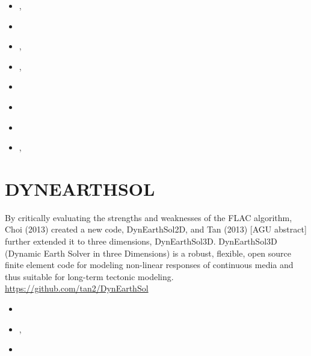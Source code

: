 \begin{small}
\begin{itemize}
\item[\twothousandeight]     \textcite{brtf08}, \textcite{thfb08}
\item[\twothousandnine]      \textcite{yahb09}
\item[\twothousandten]       \textcite{brya10}, \textcite{lobh10}
\item[\twothousandfourteen]  \textcite{mutg14}, \textcite{whbb14}
\item[\twothousandeighteen]  \textcite{neew18}
\item[\twothousandnineteen]  \textcite{koen19}
\item[\twothousandtwenty]    \textcite{scwh20}
\item[\twothousandtwentytwo] \textcite{kone22}, \textcite{konf22}
\end{itemize}
\end{small} 

\section{DYNEARTHSOL} 

By critically evaluating the strengths and weaknesses of the
FLAC algorithm, Choi \etal (2013) created a new code, DynEarthSol2D, 
and Tan \etal (2013) [AGU abstract] further extended it to three
dimensions, DynEarthSol3D. DynEarthSol3D (Dynamic Earth Solver
in three Dimensions) is a robust, flexible, open source finite
element code for modeling non-linear responses of continuous
media and thus suitable for long-term tectonic modeling.
\url{https://github.com/tan2/DynEarthSol}

\begin{small} 
\begin{itemize}
\item[\twothousandthirteen]  \textcite{chtl13}
\item[\twothousandfifteen]   \textcite{jalr15},  \textcite{tact15}
\item[\twothousandseventeen] \textcite{lolc17}
\end{itemize}
\end{small} 


